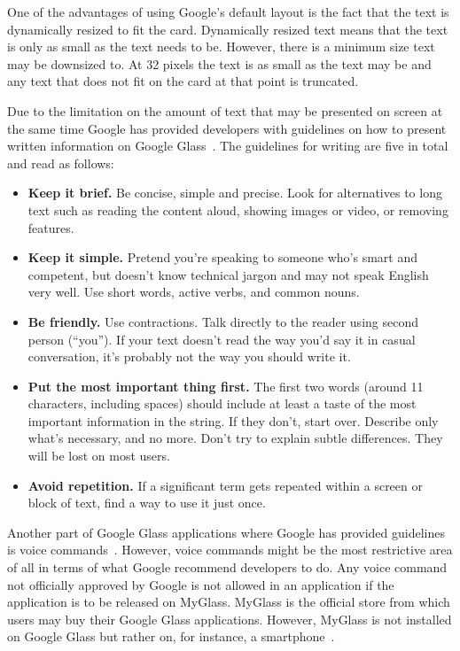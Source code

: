 One of the advantages of using Google's default layout is the fact that the text is dynamically resized to fit the card. Dynamically resized text means that the text is only as small as the text needs to be. However, there is a minimum size text may be downsized to. At 32 pixels the text is as small as the text may be and any text that does not fit on the card at that point is truncated.

Due to the limitation on the amount of text that may be presented on screen at the same time Google has provided developers with guidelines on how to present written information on Google Glass~\cite{glassDesignStyle}. The guidelines for writing are five in total and read as follows:

\begin{itemize}
	\item \textbf{Keep it brief.} Be concise, simple and precise. Look for alternatives to long text such as reading the content aloud, showing images or video, or removing features.
	\item \textbf{Keep it simple.} Pretend you're speaking to someone who's smart and competent, but doesn't know technical jargon and may not speak English very well. Use short words, active verbs, and common nouns.
	\item \textbf{Be friendly.} Use contractions. Talk directly to the reader using second person (``you''). If your text doesn't read the way you'd say it in casual conversation, it's probably not the way you should write it.
	\item \textbf{Put the most important thing first.} The first two words (around 11 characters, including spaces) should include at least a taste of the most important information in the string. If they don't, start over. Describe only what's necessary, and no more. Don't try to explain subtle differences. They will be lost on most users.
	\item \textbf{Avoid repetition.} If a significant term gets repeated within a screen or block of text, find a way to use it just once.
\end{itemize}

Another part of Google Glass applications where Google has provided guidelines is voice commands~\cite{googleGlassVoiceCommand}. However, voice commands might be the most restrictive area of all in terms of what Google recommend developers to do. Any voice command not officially approved by Google is not allowed in an application if the application is to be released on MyGlass. MyGlass is the official store from which users may buy their Google Glass applications. However, MyGlass is not installed on Google Glass but rather on, for instance, a smartphone~\cite{myGlass}.

